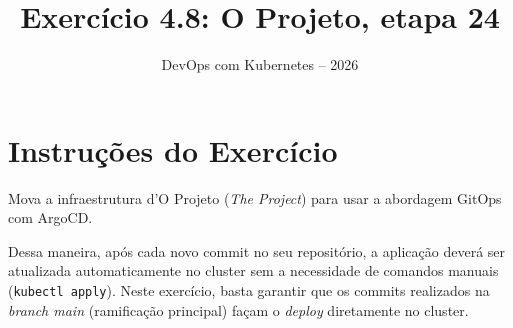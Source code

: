 \documentclass[11pt,a4paper]{article}
\title{\color{secondary}\Huge\textbf{Exercício 4.8: O Projeto, etapa 24}}
\author{\color{primary}DevOps com Kubernetes -- 2026}
\date{}
\begin{document}
\maketitle

\section*{\color{primary}Instruções do Exercício}
\begin{tcolorbox}[colback=blue!5!white,colframe=blue!75!black,title=Exercício 4.8: O Projeto, etapa 24]
Mova a infraestrutura d'O Projeto (\textit{The Project}) para usar a abordagem GitOps com ArgoCD. 

Dessa maneira, após cada novo commit no seu repositório, a aplicação deverá ser atualizada automaticamente no cluster sem a necessidade de comandos manuais (\texttt{kubectl apply}). Neste exercício, basta garantir que os commits realizados na \textit{branch main} (ramificação principal) façam o \textit{deploy} diretamente no cluster.
\end{tcolorbox}
\end{document}
